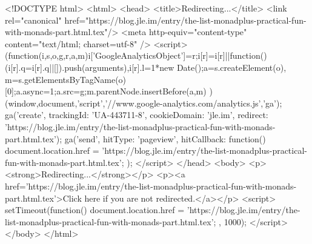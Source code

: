 <!DOCTYPE html>
<html>
<head>
<title>Redirecting...</title>
<link rel="canonical" href="https://blog.jle.im/entry/the-list-monadplus-practical-fun-with-monads-part.html.tex"/>
<meta http-equiv="content-type" content="text/html; charset=utf-8" />
<script>
(function(i,s,o,g,r,a,m){i['GoogleAnalyticsObject']=r;i[r]=i[r]||function(){
(i[r].q=i[r].q||[]).push(arguments)},i[r].l=1*new Date();a=s.createElement(o),
m=s.getElementsByTagName(o)[0];a.async=1;a.src=g;m.parentNode.insertBefore(a,m)
})(window,document,'script','//www.google-analytics.com/analytics.js','ga');
ga('create', { trackingId: 'UA-443711-8', cookieDomain: 'jle.im', redirect: 'https://blog.jle.im/entry/the-list-monadplus-practical-fun-with-monads-part.html.tex'});
ga('send', { hitType: 'pageview', hitCallback: function() { document.location.href = 'https://blog.jle.im/entry/the-list-monadplus-practical-fun-with-monads-part.html.tex'; } });
</script>
</head>
<body>
  <p><strong>Redirecting...</strong></p>
  <p><a href='https://blog.jle.im/entry/the-list-monadplus-practical-fun-with-monads-part.html.tex'>Click here if you are not redirected.</a></p>
  <script>
    setTimeout(function() { document.location.href = 'https://blog.jle.im/entry/the-list-monadplus-practical-fun-with-monads-part.html.tex'; }, 1000);
  </script>
</body>
</html>
